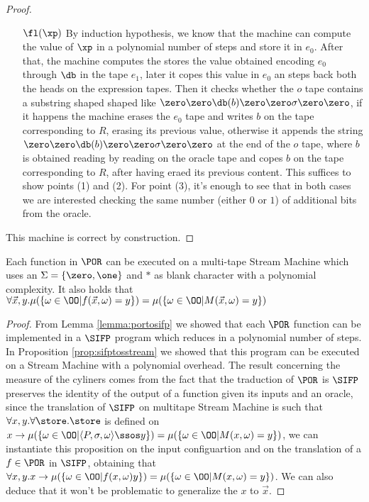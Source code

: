 \begin{proof}
\begin{itemize}
\item[$\fl(\xp)$] By induction hypothesis, we know that the machine can compute the value of $\xp$ in a polynomial number of steps and store it in $e_0$. After that, the machine computes the stores the value obtained encoding $e_0$ through $\db$ in the tape $e_1$, later it copes this value in $e_0$ an steps back both the heads on the expression tapes. Then it checks whether the $o$ tape contains a substring shaped shaped like $\zero \zero \db (b)\zero \zero \sigma \zero \zero $, if it happens the machine erases the $e_0$ tape and writes $b$ on the tape corresponding to $R$, erasing its previous value, otherwise it appends the string $\zero \zero \db (b)\zero \zero \sigma \zero \zero$ at the end of the $o$ tape, where $b$ is obtained reading by reading on the oracle tape and copes $b$ on the tape corresponding to $R$, after having eraed its previous content. This suffices to show points (1) and (2). For point (3), it's enough to see that in both cases we are interested checking the same number (either $0$ or $1$) of additional bits from the oracle.
\end{itemize}

This machine is correct by construction.
\end{proof}

\begin{corollary}
Each function in $\POR$ can be executed on a multi-tape Stream Machine which uses an $\Sigma=\{\zero, \one\}$ and $*$ as blank character with a polynomial complexity. It also holds that $\forall \vec x, y. \mu(\{\omega \in \OO | f(\vec x, \omega) = y\})=\mu(\{\omega \in \OO| M(\vec x, \omega) = y\})$
\end{corollary}

\begin{proof}
From Lemma \ref{lemma:portosifp} we showed that each $\POR$ function can be implemented in a $\SIFP$ program which reduces in a polynomial number of steps. In Proposition \ref{prop:sifptosstream} we showed that this program can be executed on a Stream Machine with a polynomial overhead. The result concerning the measure of the cyliners comes from the fact that the traduction of $\POR$ is $\SIFP$ preserves the identity of the output of a function given its inputs and an oracle, since the translation of $\SIFP$ on multitape Stream Machine is such that $\forall x, y.\forall \store.\store$ is defined on $x \to \mu(\{\omega \in \OO | \langle P, \sigma, \omega\rangle \ssos y\})=\mu(\{\omega \in \OO | M(x, \omega)=y\})$, we can instantiate this proposition on the input configuartion and on the translation of a $f \in \POR$ in $\SIFP$, obtaining that $\forall x, y. x \to \mu(\{\omega \in \OO | f(x, \omega) y\})=\mu(\{\omega \in \OO | M(x, \omega)=y\})$. We can also deduce that it won't be problematic to generalize the $x$ to $\vec x$.
\end{proof}

